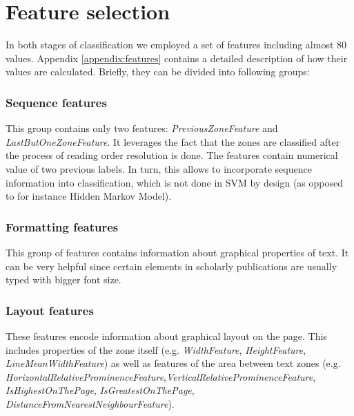 \section{Feature selection}\label{sec:feature_selection}
In both stages of classification we employed a set of features including almost 80 values. Appendix \ref{appendix:features} contains a detailed description of how their values are calculated. Briefly, they can be divided into following groups:

\subsubsection{Sequence features}
This group contains only two features: \textit{PreviousZoneFeature} and \textit{LastButOneZoneFeature}. It leverages the fact that the zones are classified after the process of reading order resolution is done. The features contain numerical value of two previous labels. In turn, this allows to incorporate sequence information into classification, which is not done in SVM by design (as opposed to for instance Hidden Markov Model).

\subsubsection{Formatting features}
This group of features contains information about graphical properties of text. It can be very helpful since certain elements in scholarly publications are usually typed with bigger font size.

\subsubsection{Layout features}
These features encode information about graphical layout on the page. This includes properties of the zone itself (e.g. \textit{WidthFeature}, \textit{HeightFeature}, \textit{LineMeanWidthFeature}) as well as features of the area between text zones (e.g. \textit{HorizontalRelativeProminenceFeature},\textit{VerticalRelativeProminenceFeature}, \textit{IsHighestOnThePage}, \textit{IsGreatestOnThePage}, \textit{DistanceFromNearestNeighbourFeature}).

